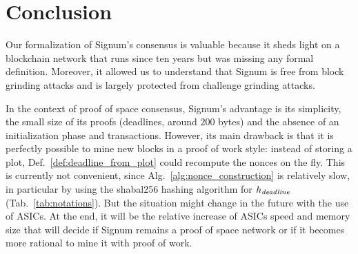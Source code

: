 \section{Conclusion}\label{sec:conclusion}
%
Our formalization of Signum's consensus is valuable because it sheds light
on a blockchain network that runs since ten years but was missing any formal definition.
Moreover, it allowed us to understand that Signum is free from block grinding attacks
and is largely protected from challenge grinding attacks.

In the context of proof of space consensus, Signum's advantage is its simplicity,
the small size of its proofs (deadlines, around $200$ bytes)
and the absence of an initialization phase and transactions.
However, its main drawback is that it is
perfectly possible to mine new blocks in a proof of work style: instead of storing a plot,
Def.~\ref{def:deadline_from_plot} could recompute the nonces on the fly. This is currently
not convenient, since Alg.~\ref{alg:nonce_construction} is relatively slow, in particular
by using the shabal256 hashing algorithm for $h_{\mathit{deadline}}$ (Tab.~\ref{tab:notations}).
But the situation might change in the future
with the use of ASICs. At the end, it will be the relative
increase of ASICs speed and memory size that will decide if Signum remains a
proof of space network or if it becomes more rational to mine it with proof of work.
